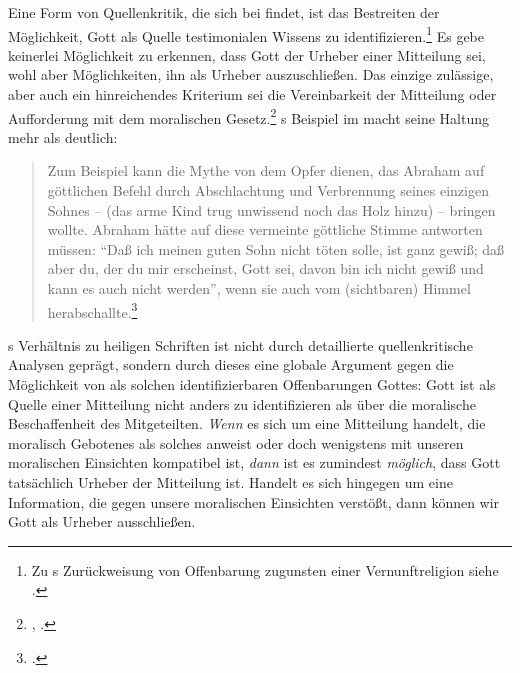 Eine Form von Quellenkritik, die sich bei  findet, ist das
Bestreiten der Möglichkeit, Gott als Quelle testimonialen Wissens zu
identifizieren.\footnote{Zu s Zurückweisung von
Offenbarung zugunsten einer Vernunftreligion siehe
\cite{Doerflinger:UeberdenaufgeklaertenUmgangmitGottesWort2009}.} Es gebe
keinerlei Möglichkeit zu erkennen, dass Gott der Urheber einer Mitteilung sei,
wohl aber Möglichkeiten, ihn als Urheber auszuschließen.
Das einzige zulässige, aber auch ein hinreichendes Kriterium sei die
Vereinbarkeit der Mitteilung oder Aufforderung mit dem moralischen
Gesetz.\footnote{\cite[Vgl.][A 102]{Kant:DerStreitderFakultaeten1977},
\cite[][VII: 63.9--17]{Kant:GesammelteWerke1900ff.}.} s
Beispiel im  macht seine Haltung mehr als deutlich:
\begin{quote}
  \label{Beispiel:AbrahamOpfertSeinenSohn}Zum Beispiel kann die
  Mythe von dem Opfer dienen, das Abraham auf göttlichen Befehl durch Abschlachtung und Verbrennung seines einzigen Sohnes -- (das
  arme Kind trug unwissend noch das Holz hinzu) -- bringen wollte. Abraham hätte
  auf diese vermeinte göttliche Stimme antworten müssen: \enquote{Daß ich
  meinen guten Sohn nicht töten solle, ist ganz gewiß; daß aber du, der du mir
  erscheinst, Gott sei, davon bin ich nicht gewiß und kann es auch nicht
  werden}, wenn sie auch vom (sichtbaren) Himmel
  herabschallte.\footnote{\cite[][A 102\,f.,]{Kant:DerStreitderFakultaeten1977}
  \cite[][VII: 63.32--38]{Kant:GesammelteWerke1900ff.}.}
\end{quote}
s Verhältnis zu heiligen Schriften ist nicht durch detaillierte
quellenkritische Analysen geprägt, sondern durch dieses eine globale Argument
gegen die Möglichkeit von als solchen identifizierbaren Offenbarungen Gottes:
Gott ist als Quelle einer Mitteilung nicht anders zu identifizieren als über die
moralische Beschaffenheit des Mitgeteilten. \emph{Wenn} es sich um eine
Mitteilung handelt, die moralisch Gebotenes als solches anweist oder doch
wenigstens mit unseren moralischen Einsichten kompatibel ist, \emph{dann} ist es
zumindest \emph{möglich}, dass Gott tatsächlich Urheber der Mitteilung ist.
Handelt es sich hingegen  um eine Information, die gegen unsere moralischen
Einsichten verstößt, dann können wir Gott als Urheber ausschließen.

